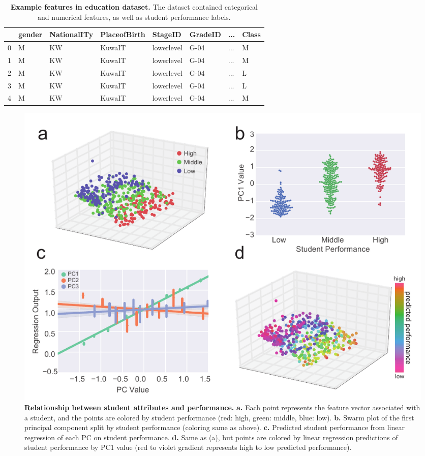 \documentclass[12pt,letterpaper]{article}
\begin{document}
\begin{table}[tbp]
\centering
\begin{tabular}{llllllll}
\toprule
{} & gender & NationalITy & PlaceofBirth &     StageID & GradeID &  ... & Class \\
\midrule
0 &      M &          KW &       KuwaIT &  lowerlevel &    G-04 &  ... &     M \\
1 &      M &          KW &       KuwaIT &  lowerlevel &    G-04 &  ... &     M \\
2 &      M &          KW &       KuwaIT &  lowerlevel &    G-04 &  ... &     L \\
3 &      M &          KW &       KuwaIT &  lowerlevel &    G-04 &  ... &     L \\
4 &      M &          KW &       KuwaIT &  lowerlevel &    G-04 &  ... &     M \\
\bottomrule
\end{tabular}
\vspace{0.1in}
\caption{\textbf{Example features in education dataset.} The dataset contained categorical and numerical features, as well as student performance labels.}
\label{tab:education}
\end{table}

\begin{figure}[tbp]
\centering
\includegraphics[width=1\textwidth]{education}
\caption{\textbf{Relationship between student attributes and performance.} \textbf{a.} Each point represents the feature vector associated with a student, and the points are colored by student performance (red: high, green: middle, blue: low). \textbf{b.} Swarm plot of the first principal component split by student performance (coloring same as above). \textbf{c.} Predicted student performance from linear regression of each PC on student performance.  \textbf{d.} Same as (a), but points are colored by linear regression predictions of student performance by PC1 value (red to violet gradient represents high to low predicted performance).}
\label{fig:education}
\end{figure}
\end{document}
